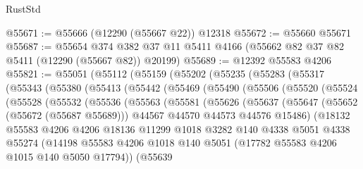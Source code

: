\begin{lexlean}{RustStd}
\begin{coremodule}
{\begin{coremodule}
{{{{{{{{{{{{{{{{{{{{{{{{{{{{{{{{{{{{{{{{{{{{{{{{{{@55671 := @55666 (@12290 (@55667 @22)) @12318
@55672 := @55660 @55671
@55687 := @55654
    @374
    @382
    @37
    @11
    @5411
    @4166
    (@55662 @82 @37 @82 @5411 (@12290 (@55667 @82)) @20199)
@55689 := @12392 @55583 @4206
@55821 := @55051
    (@55112
      (@55159
        (@55202
          (@55235
            (@55283
              (@55317
                (@55343
                  (@55380
                    (@55413
                      (@55442
                        (@55469
                          (@55490
                            (@55506
                              (@55520
                                (@55524
                                  (@55528
                                    (@55532
                                      (@55536
                                        (@55563
                                          (@55581
                                            (@55626
                                              (@55637
                                                (@55647
                                                  (@55652 (@55672 (@55687 @55689)))
                                                  @44567
                                                  @44570
                                                  @44573
                                                  @44576
                                                  @15486)
                                                (@18132
                                                  @55583
                                                  @4206
                                                  @4206
                                                  @18136
                                                  @11299
                                                  @1018
                                                  @3282
                                                  @140
                                                  @4338
                                                  @5051
                                                  @4338
                                                  @55274
                                                  (@14198
                                                    @55583
                                                    @4206
                                                    @1018
                                                    @140
                                                    @5051
                                                    (@17782 @55583 @4206 @1015 @140 @5050 @17794))
                                                  (@55639
}}}}}}}}}}}}}}}}}}}}}}}}}}}}}}}}}}}}}}}}}}}}}}}}}}
\end{coremodule}}
\end{coremodule}
\end{lexlean}
